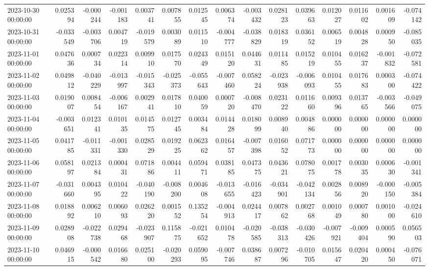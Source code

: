 \begin{tabular}{lrrrrrrrrrrrrrr}
2023-10-30 00:00:00 & 0.025394 & -0.000244 & -0.001183 & 0.003741 & 0.007855 & 0.012545 & 0.006374 & -0.003432 & 0.028123 & 0.039663 & 0.012027 & 0.011602 & 0.001609 & -0.074142 \\
2023-10-31 00:00:00 & -0.033549 & -0.003706 & 0.004719 & -0.019579 & 0.003089 & 0.011510 & -0.004777 & -0.038829 & 0.018319 & 0.036152 & 0.006519 & 0.004828 & 0.000950 & -0.085035 \\
2023-11-01 00:00:00 & 0.047636 & 0.000734 & 0.022314 & 0.009910 & 0.017570 & 0.024349 & 0.015120 & 0.044631 & 0.011485 & 0.015219 & 0.010455 & 0.016237 & -0.001832 & -0.072581 \\
2023-11-02 00:00:00 & 0.049812 & -0.040229 & -0.013997 & -0.015343 & -0.025373 & -0.055643 & -0.007460 & 0.058224 & -0.023938 & -0.006093 & 0.010455 & 0.017683 & 0.000300 & -0.074422 \\
2023-11-03 00:00:00 & 0.019007 & 0.008454 & -0.006167 & 0.002941 & 0.017810 & 0.040059 & 0.000720 & -0.008470 & 0.023122 & 0.011660 & 0.009396 & 0.013765 & -0.003566 & -0.049075 \\
2023-11-04 00:00:00 & -0.003651 & 0.012341 & 0.010135 & 0.014575 & 0.012745 & 0.003484 & 0.014428 & 0.018099 & 0.008940 & 0.004886 & 0.000000 & 0.000000 & 0.000000 & 0.000000 \\
2023-11-05 00:00:00 & 0.041785 & -0.011331 & -0.001330 & 0.028529 & 0.019225 & 0.062362 & 0.016457 & -0.007398 & 0.016052 & 0.071773 & 0.000000 & 0.000000 & 0.000000 & 0.000000 \\
2023-11-06 00:00:00 & 0.058197 & 0.021384 & 0.000431 & 0.071886 & 0.004411 & 0.059471 & 0.038185 & 0.047375 & 0.043621 & 0.078075 & 0.001778 & 0.003035 & 0.000630 & -0.001341 \\
2023-11-07 00:00:00 & -0.031660 & 0.004395 & 0.010422 & -0.040190 & -0.008200 & 0.004608 & -0.013655 & -0.016423 & -0.034901 & -0.042134 & 0.002856 & 0.008920 & -0.000150 & -0.005384 \\
2023-11-08 00:00:00 & 0.018892 & 0.006210 & 0.006093 & 0.026220 & 0.001552 & 0.135254 & -0.004913 & 0.024417 & 0.007862 & 0.002768 & 0.001049 & 0.000780 & 0.001000 & -0.024610 \\
2023-11-09 00:00:00 & 0.028908 & -0.022738 & 0.029468 & -0.023907 & 0.115875 & -0.021652 & 0.010478 & -0.020585 & -0.038313 & -0.030426 & -0.007921 & -0.009404 & 0.000590 & 0.056503 \\
2023-11-10 00:00:00 & 0.046915 & -0.000542 & 0.016680 & 0.025100 & -0.020293 & 0.059095 & -0.007746 & 0.038687 & 0.007296 & -0.010705 & 0.015647 & 0.020420 & 0.000450 & -0.076071 \\

\end{tabular}
